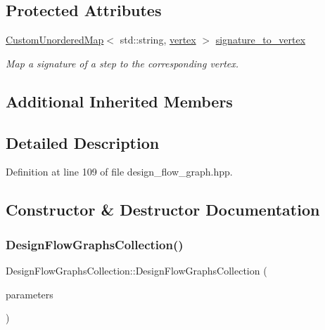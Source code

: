 \subsection*{Protected Attributes}
\begin{DoxyCompactItemize}
\item 
\hyperlink{custom__map_8hpp_ad1ed68f2ff093683ab1a33522b144adc}{Custom\+Unordered\+Map}$<$ std\+::string, \hyperlink{graph_8hpp_abefdcf0544e601805af44eca032cca14}{vertex} $>$ \hyperlink{classDesignFlowGraphsCollection_a7acfd27a06c94efb6471230f1c9a8f67}{signature\+\_\+to\+\_\+vertex}
\begin{DoxyCompactList}\small\item\em Map a signature of a step to the corresponding vertex. \end{DoxyCompactList}\end{DoxyCompactItemize}
\subsection*{Additional Inherited Members}


\subsection{Detailed Description}


Definition at line 109 of file design\+\_\+flow\+\_\+graph.\+hpp.



\subsection{Constructor \& Destructor Documentation}
\mbox{\label{classDesignFlowGraphsCollection_a8a9fa3c0c234c85ce301233af1bb9c8d}} 
\subsubsection{\texorpdfstring{Design\+Flow\+Graphs\+Collection()}{DesignFlowGraphsCollection()}}
{\footnotesize\ttfamily Design\+Flow\+Graphs\+Collection\+::\+Design\+Flow\+Graphs\+Collection (\begin{DoxyParamCaption}\item[{const \hyperlink{Parameter_8hpp_a37841774a6fcb479b597fdf8955eb4ea}{Parameter\+Const\+Ref}}]{parameters }\end{DoxyParamCaption})\hspace{0.3cm}{\ttfamily [explicit]}}



